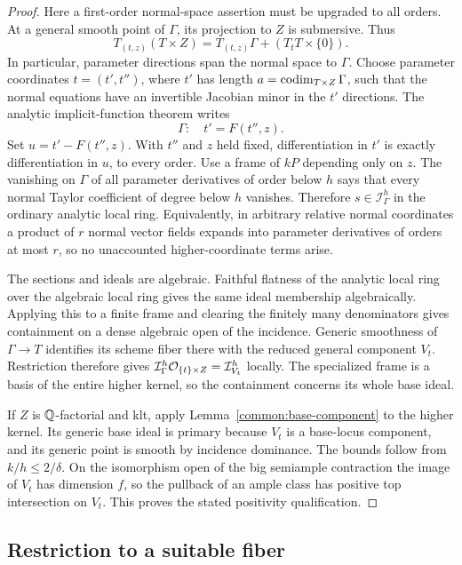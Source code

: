 \begin{proof}
Here a first-order normal-space assertion must be upgraded to
all orders. At a general smooth point of $\Gamma$, its projection
to $Z$ is submersive. Thus
\[
 T_{(t,z)}(T\times Z)
 =T_{(t,z)}\Gamma+(T_tT\times\{0\}).
\]
In particular, parameter directions span the normal space to
$\Gamma$. Choose parameter coordinates
$t=(t',t'')$, where $t'$ has length
$a=\operatorname{codim}_{T\times Z}\Gamma$, such that the normal equations have
an invertible Jacobian minor in the $t'$ directions. The analytic
implicit-function theorem writes
\[
 \Gamma:\quad t'=F(t'',z).
\]
Set $u=t'-F(t'',z)$. With $t''$ and $z$ held fixed, differentiation
in $t'$ is exactly differentiation in $u$, to every order. Use a
frame of $kP$ depending only on $z$. The vanishing on $\Gamma$
of all parameter derivatives of order below $h$ says that every
normal Taylor coefficient of degree below $h$ vanishes. Therefore
$s\in\mathcal I_\Gamma^h$ in the ordinary analytic local ring.
Equivalently, in arbitrary relative normal coordinates a product
of $r$ normal vector fields expands into parameter derivatives
of orders at most $r$, so no unaccounted higher-coordinate terms
arise.

The sections and ideals are algebraic. Faithful flatness of the
analytic local ring over the algebraic local ring gives the same
ideal membership algebraically. Applying this to a finite frame
and clearing the finitely many denominators gives containment
on a dense algebraic open of the incidence. Generic smoothness
of $\Gamma\to T$ identifies its scheme fiber there with the
reduced general component $V_t$. Restriction therefore gives
$\mathcal I_\Gamma^h\mathcal{O}_{\{t\}\times Z}=\mathcal I_{V_t}^h$ locally.
The specialized frame is a basis of the entire higher kernel,
so the containment concerns its whole base ideal.

If $Z$ is $\mathbb{Q}$-factorial and klt, apply
Lemma~\ref{common:base-component} to the higher kernel.
Its generic base ideal is primary because $V_t$ is a base-locus
component, and its generic point is smooth by incidence dominance.
The bounds follow from $k/h\le2/\delta$. On the isomorphism open
of the big semiample contraction the image of $V_t$ has dimension
$f$, so the pullback of an ample class has positive top intersection
on $V_t$. This proves the stated positivity qualification.
\end{proof}

\subsection{Restriction to a suitable fiber}

